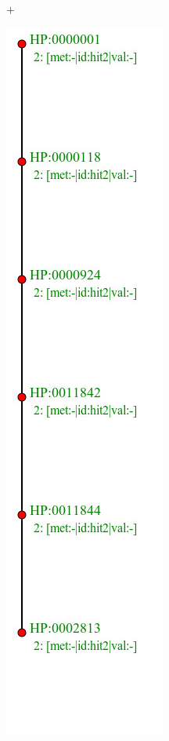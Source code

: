 \documentclass{beamer}
\begin{document}
\begin{frame}
\begin{minipage}{0.2\textwidth}
		\end{minipage}$+$\hspace*{1em}
		\begin{minipage}{0.1\textwidth}
			\includegraphics[width=\textwidth]{p2.jpg}\\

\end{minipage}
\end{frame}
\end{document}
